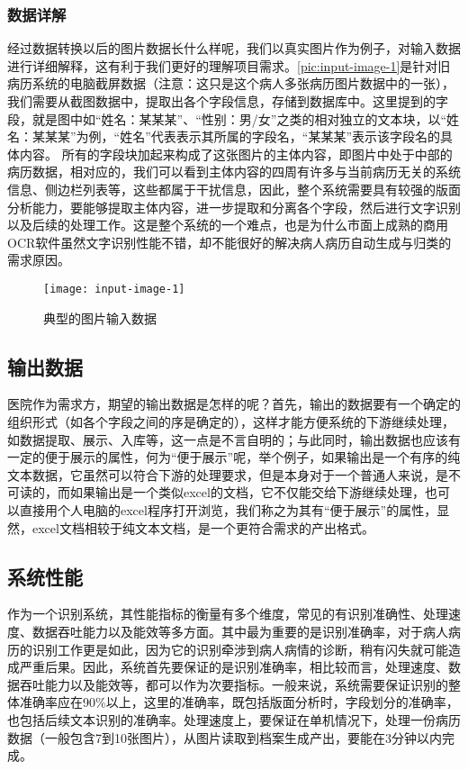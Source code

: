 \subsubsection*{数据详解}
经过数据转换以后的图片数据长什么样呢，我们以真实图片作为例子，对输入数据进行详细解释，这有利于我们更好的理解项目需求。\autoref{pic:input-image-1}是针对旧病历系统的电脑截屏数据（注意：这只是这个病人多张病历图片数据中的一张），我们需要从截图数据中，提取出各个字段信息，存储到数据库中。这里提到的字段，就是图中如“姓名：某某某”、“性别：男/女”之类的相对独立的文本块，以“姓名：某某某”为例，“姓名”代表表示其所属的字段名，“某某某”表示该字段名的具体内容。
所有的字段块加起来构成了这张图片的主体内容，即图片中处于中部的病历数据，相对应的，我们可以看到主体内容的四周有许多与当前病历无关的系统信息、侧边栏列表等，这些都属于干扰信息，因此，整个系统需要具有较强的版面分析能力，要能够提取主体内容，进一步提取和分离各个字段，然后进行文字识别以及后续的处理工作。这是整个系统的一个难点，也是为什么市面上成熟的商用OCR软件虽然文字识别性能不错，却不能很好的解决病人病历自动生成与归类的需求原因。
\begin{figure}[htbp]
	\centering
	\texttt{[image: input-image-1]}
	\caption{典型的图片输入数据}
	\label{pic:input-image-1}
\end{figure}

\subsection{输出数据}
\label{ssub:requirements-dataWriter}
医院作为需求方，期望的输出数据是怎样的呢？首先，输出的数据要有一个确定的组织形式（如各个字段之间的序是确定的），这样才能方便系统的下游继续处理，如数据提取、展示、入库等，这一点是不言自明的；与此同时，输出数据也应该有一定的便于展示的属性，何为“便于展示”呢，举个例子，如果输出是一个有序的纯文本数据，它虽然可以符合下游的处理要求，但是本身对于一个普通人来说，是不可读的，而如果输出是一个类似excel的文档，它不仅能交给下游继续处理，也可以直接用个人电脑的excel程序打开浏览，我们称之为其有“便于展示”的属性，显然，excel文档相较于纯文本文档，是一个更符合需求的产出格式。

\subsection{系统性能}
作为一个识别系统，其性能指标的衡量有多个维度，常见的有识别准确性、处理速度、数据吞吐能力以及能效等多方面。其中最为重要的是识别准确率，对于病人病历的识别工作更是如此，因为它的识别牵涉到病人病情的诊断，稍有闪失就可能造成严重后果。因此，系统首先要保证的是识别准确率，相比较而言，处理速度、数据吞吐能力以及能效等，都可以作为次要指标。一般来说，系统需要保证识别的整体准确率应在90\%以上，这里的准确率，既包括版面分析时，字段划分的准确率，也包括后续文本识别的准确率。处理速度上，要保证在单机情况下，处理一份病历数据（一般包含7到10张图片），从图片读取到档案生成产出，要能在3分钟以内完成。

